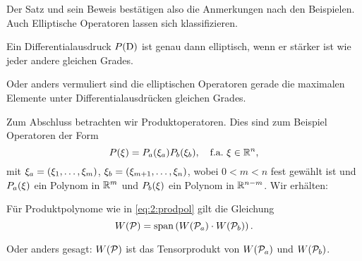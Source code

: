 Der Satz und sein Beweis bestätigen also die Anmerkungen nach den Beispielen.
Auch Elliptische Operatoren lassen sich klassifizieren.

\begin{thm}
Ein Differentialausdruck $P(\mathrm D)$ ist genau dann elliptisch,
wenn er stärker ist wie jeder andere gleichen Grades.
\end{thm}

Oder anders vermuliert sind die elliptischen Operatoren
gerade die maximalen Elemente
unter Differentialausdrücken gleichen Grades.

Zum Abschluss betrachten wir Produktoperatoren.
Dies sind zum Beispiel Operatoren der Form
\begin{equation}\label{eq:2:prodpol}
P(\xi)=P_a(\xi_a)P_b(\xi_b),
\quad\text{f.a.}~\xi\in\mathbb R^n,
\end{equation}
mit $\xi_a=(\xi_1,\dots,\xi_m)$, $\xi_b=(\xi_{m+1},\dots,\xi_n)$,
wobei $0<m<n$ fest gewählt ist
und $P_a(\xi)$ ein Polynom in $\mathbb R^m$
und $P_b(\xi)$ ein Polynom in $\mathbb R^{n-m}$.
Wir erhälten:

\begin{thm}
Für Produktpolynome wie in \eqref{eq:2:prodpol}
gilt die Gleichung
\begin{equation}
W(\mathcal P)=\operatorname{span}\left(W(\mathcal P_a)\cdot W(\mathcal P_b)\right).
\end{equation}
\end{thm}

Oder anders gesagt:
$W(\mathcal P)$ ist das Tensorprodukt von $W(\mathcal P_a)$ und $W(\mathcal P_b)$.


